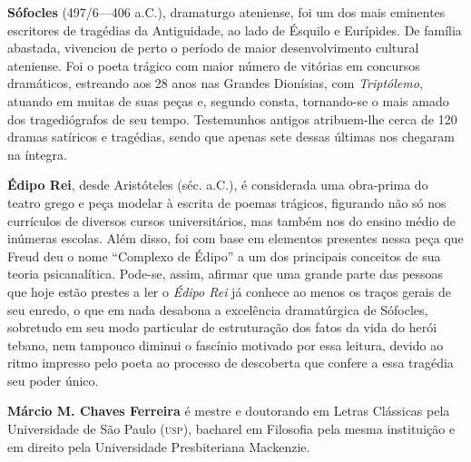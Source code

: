 \textbf{Sófocles} (497/6---406 a.C.), dramaturgo ateniense, foi um dos mais eminentes 
escritores de tragédias da Antiguidade, ao lado de Ésquilo e Eurípides. De família abastada, vivenciou de perto 
o período de maior desenvolvimento cultural ateniense. Foi o poeta trágico com maior 
número de vitórias em concursos dramáticos, estreando aos 28 anos nas Grandes Dionísias, com \textit{Triptólemo}, 
atuando em muitas de suas peças e, segundo consta, tornando-se o mais amado dos tragediógrafos de seu tempo. 
Testemunhos antigos atribuem-lhe cerca de 120 dramas satíricos e tragédias, sendo que apenas sete dessas últimas nos chegaram na íntegra. 


\textbf{Édipo Rei}, desde Aristóteles (séc.  a.C.), é considerada uma
obra-prima do teatro grego e peça modelar à escrita de poemas trágicos, 
figurando não só nos currículos de diversos
cursos universitários, mas também nos do ensino médio de inúmeras
escolas. Além disso, foi com base em elementos presentes nessa
peça que Freud deu o nome ``Complexo de Édipo'' a um dos principais
conceitos de sua teoria psicanalítica. Pode-se, assim, afirmar que uma grande 
parte das pessoas que hoje estão prestes
a ler o \textit{Édipo Rei} já conhece ao menos os traços
gerais de seu enredo, o que em nada desabona a excelência dramatúrgica de Sófocles,
sobretudo em seu modo particular de estruturação dos fatos da vida do herói
tebano, nem tampouco diminui o fascínio motivado por essa leitura, 
devido ao ritmo impresso pelo poeta ao processo de descoberta que
confere a essa tragédia seu poder único.


\textbf{Márcio M. Chaves Ferreira} é mestre e doutorando em Letras Clássicas pela Universidade 
de São Paulo (\textsc{usp}), bacharel em Filosofia pela mesma instituição e em direito pela 
Universidade Presbiteriana Mackenzie.\par
